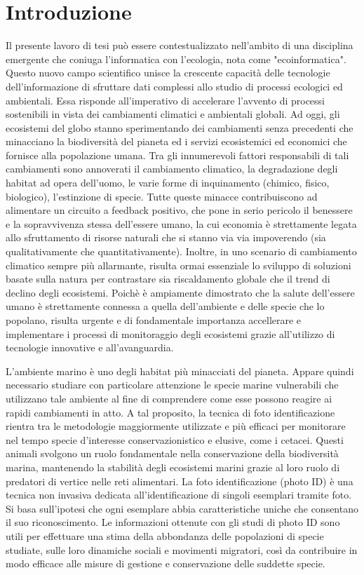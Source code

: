 \documentclass[a4paper,12pt]{report}
\begin{document}
\chapter{Introduzione}
  Il presente lavoro di tesi può essere contestualizzato nell’ambito di una disciplina emergente che coniuga l'informatica con
  l'ecologia, nota come "ecoinformatica". Questo nuovo campo scientifico unisce la crescente capacità delle tecnologie 
  dell’informazione di sfruttare dati complessi allo studio di processi ecologici ed ambientali. Essa risponde all'imperativo di accelerare
  l’avvento di processi sostenibili in vista dei cambiamenti climatici e ambientali
  globali.
  Ad oggi, gli ecosistemi del globo stanno sperimentando dei cambiamenti senza precedenti che minacciano la biodiversità del pianeta
  ed i servizi ecosistemici ed economici che fornisce alla popolazione umana. Tra gli innumerevoli fattori responsabili di tali cambiamenti sono annoverati
  il cambiamento climatico, la degradazione degli habitat ad opera dell'uomo, le varie forme di inquinamento (chimico, fisico, biologico), 
  l'estinzione di specie. Tutte queste minacce contribuiscono ad alimentare un circuito a feedback positivo, 
  che pone in serio pericolo il benessere e la sopravvivenza stessa dell'essere umano, la cui economia è strettamente
  legata allo sfruttamento di risorse naturali che si stanno via via impoverendo (sia qualitativamente che quantitativamente). Inoltre, 
  in uno scenario di cambiamento climatico sempre più allarmante, risulta ormai essenziale lo sviluppo di soluzioni basate sulla
  natura per contrastare sia riscaldamento globale che il trend di declino degli ecosistemi. Poichè è ampiamente dimostrato che la salute dell'essere umano è strettamente
  connessa a quella dell'ambiente e delle specie che lo popolano, risulta urgente e di fondamentale importanza accellerare e implementare i processi di
  monitoraggio degli ecosistemi grazie all'utilizzo di tecnologie innovative e all'avanguardia.
  
  L'ambiente marino è uno degli habitat più minacciati del pianeta. Appare quindi necessario 
  studiare con particolare attenzione le specie marine
  vulnerabili che utilizzano tale ambiente al fine di comprendere come esse possono reagire ai rapidi cambiamenti in atto. 
  A tal proposito, la tecnica di foto identificazione rientra tra le metodologie maggiormente
  utilizzate e più efficaci per monitorare nel tempo specie d'interesse conservazionistico e elusive, 
  come i cetacei. Questi animali svolgono un ruolo fondamentale nella conservazione della biodiversità marina, mantenendo la stabilità 
  degli ecosistemi marini grazie al loro ruolo di predatori di vertice nelle reti alimentari.
  La foto identificazione (photo ID) è una tecnica non invasiva dedicata all'identificazione 
  di singoli esemplari tramite foto. Si basa sull'ipotesi che ogni esemplare abbia caratteristiche uniche che consentano il suo riconoscimento.
  Le informazioni ottenute con gli studi di photo ID sono utili per effettuare una stima della abbondanza delle popolazioni di specie studiate,
  sulle loro dinamiche sociali e movimenti migratori, così da contribuire in modo efficace alle misure di gestione e conservazione delle suddette specie.
\end{document}
